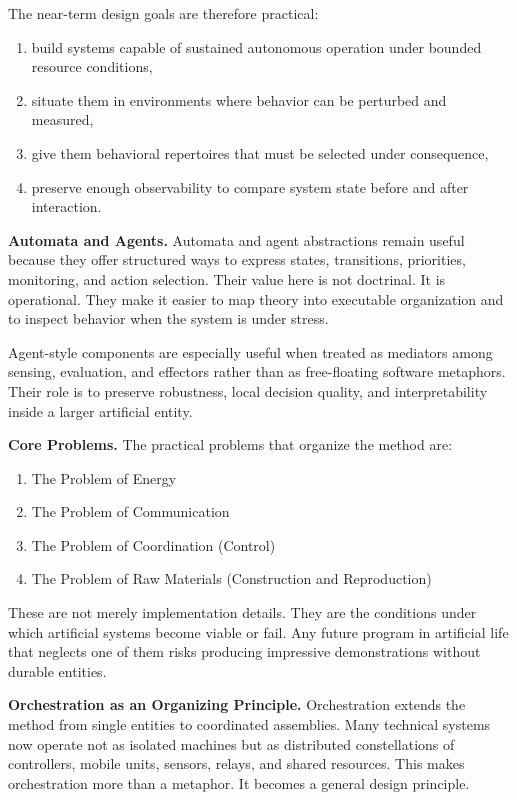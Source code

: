 \documentclass[a4paper,english]{article}
\begin{document}
The near-term design goals are therefore practical:
\begin{enumerate}
\item build systems capable of sustained autonomous operation under bounded
resource conditions,
\item situate them in environments where behavior can be perturbed and measured,
\item give them behavioral repertoires that must be selected under consequence,
\item preserve enough observability to compare system state before and after
interaction.
\end{enumerate}

\textbf{Automata and Agents.} Automata and agent abstractions remain useful because they offer structured
ways to express states, transitions, priorities, monitoring, and action
selection. Their value here is not doctrinal. It is operational. They
make it easier to map theory into executable organization and to inspect
behavior when the system is under stress.

Agent-style components are especially useful when treated as mediators
among sensing, evaluation, and effectors rather than as free-floating
software metaphors. Their role is to preserve robustness, local decision
quality, and interpretability inside a larger artificial entity.

\textbf{Core Problems.} The practical problems that organize the method are:
\begin{enumerate}
\item The Problem of Energy
\item The Problem of Communication
\item The Problem of Coordination (Control)
\item The Problem of Raw Materials (Construction and Reproduction)
\end{enumerate}
These are not merely implementation details. They are the conditions
under which artificial systems become viable or fail. Any future program
in artificial life that neglects one of them risks producing impressive
demonstrations without durable entities.

\textbf{Orchestration as an Organizing Principle.} Orchestration extends the method from single entities to coordinated
assemblies. Many technical systems now operate not as isolated machines
but as distributed constellations of controllers, mobile units, sensors,
relays, and shared resources. This makes orchestration more than a
metaphor. It becomes a general design principle.
\end{document}
